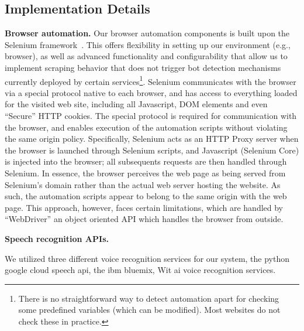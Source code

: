 \subsection{Implementation Details}

\textbf{Browser automation.}
Our browser automation components is built upon the Selenium framework~\cite{selenium}. This offers
flexibility in setting up our environment (e.g., browser), as well as advanced functionality
and configurability that allow us to implement scraping behavior that does not trigger bot detection
mechanisms currently deployed by certain services\footnote{There is no straightforward way to detect 
automation apart for checking some predefined variables (which can be modified). Most websites do not 
check these in practice.}.
Selenium communicates with the browser via a special protocol 
native to each browser, and has access to everything loaded for the visited web site, including all Javascript, DOM 
elements and even ``Secure'' HTTP cookies. The special protocol is required for communication with the browser,
and enables execution of the automation scripts without violating the same origin policy.
Specifically, Selenium acts as an HTTP Proxy server when
the browser is launched through Selenium scripts, and Javascript (Selenium Core) is injected into the browser;
all subsequents requests are then handled through Selenium. In essence, the browser perceives the
web page as being served from Selenium's domain rather than the actual web server hosting the website.
As such, the automation scripts appear to belong to the same origin with the web page. This approach, 
however, faces certain limitations, which are handled by ``WebDriver'' an object oriented API
which handles the browser from outside. 


\textbf{Speech recognition APIs.} 

We utilized three different voice recognition services for our system, the python google cloud speech api, 
the ibm bluemix, Wit ai voice recognition services.
